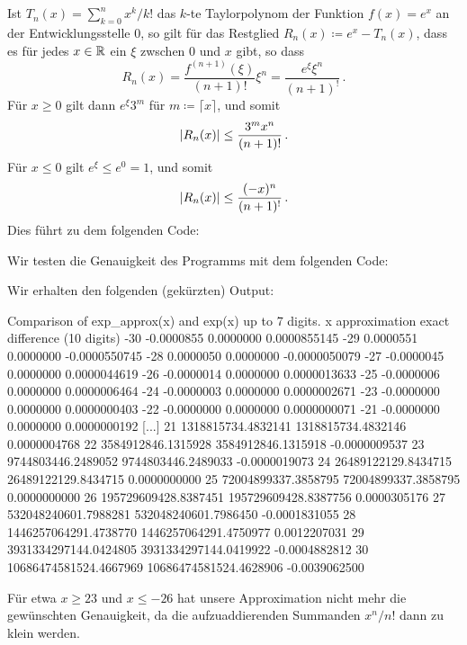 \section{}

Ist $T_n(x) = \sum_{k=0}^n x^k/k!$ das $k$-te Taylorpolynom der Funktion $f(x) = e^x$ an der Entwicklungsstelle $0$, so gilt für das Restglied $R_n(x) \coloneqq e^x - T_n(x)$, dass es für jedes $x \in \mathbb{R}$ ein $\xi$ zwschen $0$ und $x$ gibt, so dass
\[
    R_n(x)
  = \frac{f^{(n+1)}(\xi)}{(n+1)!} \xi^n
  = \frac{e^\xi \xi^n}{(n+1)^!} \,.
\]
Für $x \geq 0$ gilt dann $e^\xi 3^m$ für $m \coloneqq \lceil x \rceil$, und somit
\[
        \lvert R_n(x)\rvert
  \leq  \frac{3^m x^n}{(n+1)!} \,.
\]
Für $x \leq 0$ gilt $e^\xi \leq e^0 = 1$, und somit
\[
        \lvert R_n(x)\rvert
  \leq  \frac{(-x)^n}{(n+1)^!} \,.
\]
Dies führt zu dem folgenden Code:



Wir testen die Genauigkeit des Programms mit dem folgenden Code:



Wir erhalten den folgenden (gekürzten) Output:
\begin{consoleoutput}
Comparison of exp_approx(x) and exp(x) up to 7 digits.
  x            approximation                    exact   difference (10 digits)
-30               -0.0000855                0.0000000    0.0000855145
-29                0.0000551                0.0000000   -0.0000550745
-28                0.0000050                0.0000000   -0.0000050079
-27               -0.0000045                0.0000000    0.0000044619
-26               -0.0000014                0.0000000    0.0000013633
-25               -0.0000006                0.0000000    0.0000006464
-24               -0.0000003                0.0000000    0.0000002671
-23               -0.0000000                0.0000000    0.0000000403
-22               -0.0000000                0.0000000    0.0000000071
-21               -0.0000000                0.0000000    0.0000000192
[...]
 21       1318815734.4832141       1318815734.4832146    0.0000004768
 22       3584912846.1315928       3584912846.1315918   -0.0000009537
 23       9744803446.2489052       9744803446.2489033   -0.0000019073
 24      26489122129.8434715      26489122129.8434715    0.0000000000
 25      72004899337.3858795      72004899337.3858795    0.0000000000
 26     195729609428.8387451     195729609428.8387756    0.0000305176
 27     532048240601.7988281     532048240601.7986450   -0.0001831055
 28    1446257064291.4738770    1446257064291.4750977    0.0012207031
 29    3931334297144.0424805    3931334297144.0419922   -0.0004882812
 30   10686474581524.4667969   10686474581524.4628906   -0.0039062500
\end{consoleoutput}

Für etwa $x \geq 23$ und $x \leq -26$ hat unsere Approximation nicht mehr die gewünschten Genauigkeit, da die aufzuaddierenden Summanden $x^n/n!$ dann zu klein werden.




